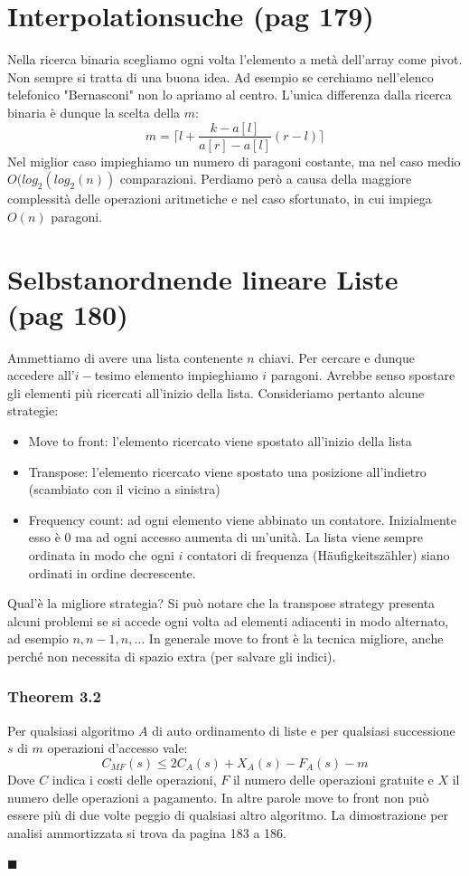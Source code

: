 \documentclass[a4paper]{book}
\newenvironment{mytheorem}[1]{\subsubsection*{Theorem #1}}{\begin{flushright}$\blacksquare$\end{flushright}}
\begin{document}
\section{Interpolationsuche (pag 179)}
Nella ricerca binaria scegliamo ogni volta l'elemento a metà dell'array come pivot. Non sempre si tratta di una buona idea. Ad esempio se cerchiamo nell'elenco telefonico "Bernasconi" non lo apriamo al centro. L'unica differenza dalla ricerca binaria è dunque la scelta della $m$:
$$m= \lceil l+ \frac{k-a[l]}{a[r]-a[l]}(r-l) \rceil$$
Nel miglior caso impieghiamo un numero di paragoni costante, ma nel caso medio $O(log_2(log_2(n))$ comparazioni. Perdiamo però a causa della maggiore complessità delle operazioni aritmetiche e nel caso sfortunato, in cui impiega $O(n)$ paragoni.
\section{Selbstanordnende lineare Liste (pag 180)}
Ammettiamo di avere una lista contenente $n$ chiavi. Per cercare e dunque accedere all'$i-$tesimo elemento impieghiamo $i$ paragoni. Avrebbe senso spostare gli elementi più ricercati all'inizio della lista. Consideriamo pertanto alcune strategie: 
\begin{itemize}
\item Move to front: l'elemento ricercato viene spostato all'inizio della lista
\item Transpose: l'elemento ricercato viene spostato una posizione all'indietro (scambiato con il vicino a sinistra)
\item Frequency count: ad ogni elemento viene abbinato un contatore. Inizialmente esso è 0 ma ad ogni accesso aumenta di un'unità. La lista viene sempre ordinata in modo che ogni $i$ contatori di frequenza (Häufigkeitszähler) siano ordinati in ordine decrescente. 
\end{itemize}
Qual'è la migliore strategia? Si può notare che la transpose strategy presenta alcuni problemi se si accede ogni volta ad elementi adiacenti in modo alternato, ad esempio $n,n-1,n,\dots$ In generale move to front è la tecnica migliore, anche perché non necessita di spazio extra (per salvare gli indici).
\begin{mytheorem}{3.2}
Per qualsiasi algoritmo $A$ di auto ordinamento di liste e per qualsiasi successione $s$ di $m$ operazioni d'accesso vale:
$$ C_{MF}(s) \leq 2C_A(s)+X_A(s)-F_A(s)-m $$
Dove $C$ indica i costi delle operazioni, $F$ il numero delle operazioni gratuite e $X$ il numero delle operazioni a pagamento. In altre parole move to front non può essere più di due volte peggio di qualsiasi altro algoritmo. La dimostrazione per analisi ammortizzata si trova da pagina 183 a 186.
\end{mytheorem}
\end{document}

